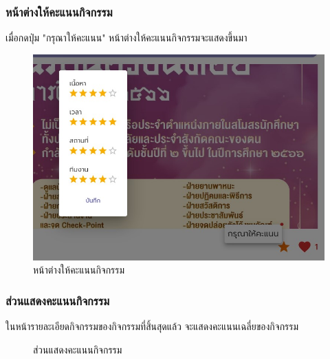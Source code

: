 \subsubsection{หน้าต่างให้คะแนนกิจกรรม}
เมื่อกดปุ่ม "กรุณาให้คะแนน" หน้าต่างให้คะแนนกิจกรรมจะแสดงขึ้นมา
\begin{figure}[H]
\begin{center}
\includegraphics[scale=0.6]{public/act-review.jpg}
\end{center}
\caption[หน้าต่างให้คะแนนกิจกรรม]{หน้าต่างให้คะแนนกิจกรรม}
\label{fig:review-window}
\end{figure}
\subsubsection{ส่วนแสดงคะแนนกิจกรรม}
ในหน้ารายละเอียดกิจกรรมของกิจกรรมที่สิ้นสุดแล้ว จะแสดงคะแนนเฉลี่ยของกิจกรรม
\begin{figure}[H]
\begin{center}
\end{center}
\caption[ส่วนแสดงคะแนนกิจกรรม]{ส่วนแสดงคะแนนกิจกรรม}
\label{fig:score-section}
\end{figure}


